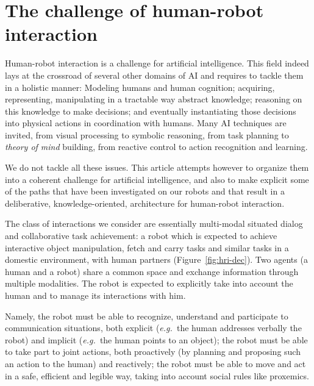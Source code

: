 \documentclass[preprint,3p,times]{elsarticle}
\newcommand{\eg}{{\textit{e.g.\ }}}
\begin{document}

\section{The challenge of human-robot interaction}

Human-robot interaction is a challenge for artificial intelligence. This field
indeed lays at the crossroad of several other domains of AI and requires to
tackle them in a holistic manner: Modeling humans and human cognition;
acquiring, representing, manipulating in a tractable way abstract knowledge;
reasoning on this knowledge to make decisions; and eventually instantiating
those decisions into physical actions in coordination with humans. Many AI
techniques are invited, from visual processing to symbolic reasoning, from task
planning to \emph{theory of mind} building, from reactive control to action
recognition and learning.

We do not tackle all these issues. This article attempts however to organize
them into a coherent challenge for artificial intelligence, and also to make
explicit some of the paths that have been investigated on our robots and that
result in a deliberative, knowledge-oriented, architecture for human-robot
interaction.

The class of interactions we consider are essentially multi-modal situated
dialog and collaborative task achievement: a robot which is expected to achieve
interactive object manipulation, fetch and carry tasks and similar tasks in a
domestic environment, with human partners (Figure~\ref{fig:hri-dec}). Two
agents (a human and a robot) share a common space and exchange information
through multiple modalities. The robot is expected to explicitly take into
account the human and to manage its interactions with him.

Namely, the robot must be able to recognize, understand and participate
to communication situations, both explicit (\eg the human addresses verbally
the robot) and implicit (\eg the human points to an object); the robot must be
able to take part to joint actions, both proactively (by planning and proposing
such an action to the human) and reactively; the robot must be able to move and
act in a safe, efficient and legible way, taking into account social rules like
proxemics.
\end{document}
